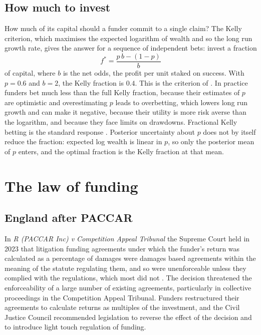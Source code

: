 \subsection{How much to invest}

How much of its capital should a funder commit to a single claim? The Kelly criterion, which maximises the expected logarithm of wealth and so the long run growth rate, gives the answer for a sequence of independent bets: invest a fraction
\begin{equation}
f^\ast = \frac{p\,b - (1-p)}{b}
\end{equation}
of capital, where $b$ is the net odds, the profit per unit staked on success. With $p = 0.6$ and $b = 2$, the Kelly fraction is $0.4$. This is the criterion of \citet{kelly1956}. In practice funders bet much less than the full Kelly fraction, because their estimates of $p$ are optimistic and overestimating $p$ leads to overbetting, which lowers long run growth and can make it negative, because their utility is more risk averse than the logarithm, and because they face limits on drawdowns. Fractional Kelly betting is the standard response \citep{maclean2011}. Posterior uncertainty about $p$ does not by itself reduce the fraction: expected log wealth is linear in $p$, so only the posterior mean of $p$ enters, and the optimal fraction is the Kelly fraction at that mean.

\section{The law of funding}

\subsection{England after PACCAR}

In \emph{R (PACCAR Inc) v Competition Appeal Tribunal} the Supreme Court held in 2023 that litigation funding agreements under which the funder's return was calculated as a percentage of damages were damages based agreements within the meaning of the statute regulating them, and so were unenforceable unless they complied with the regulations, which most did not \citep{paccar2023}. The decision threatened the enforceability of a large number of existing agreements, particularly in collective proceedings in the Competition Appeal Tribunal. Funders restructured their agreements to calculate returns as multiples of the investment, and the Civil Justice Council recommended legislation to reverse the effect of the decision and to introduce light touch regulation of funding.

